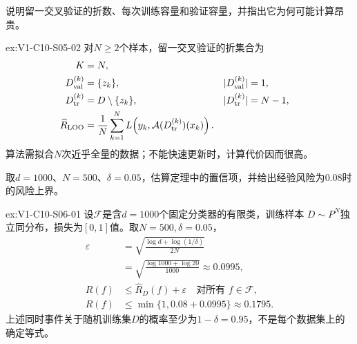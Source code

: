 \begin{SLChapterExercisePairSection}
\begin{exercise}\label{ex:V1-C10-S05-02}
说明留一交叉验证的折数、每次训练容量和验证容量，并指出它为何可能计算昂贵。
\end{exercise}
\label{sol:V1-C10-S05-02}
\begin{chapterexercisesolution}{ex:V1-C10-S05-02}
对$N\ge2$个样本，留一交叉验证的折集合为
\[
\begin{aligned}
K&=N,\\
D_{\rm val}^{(k)}&=\{z_k\},&
|D_{\rm val}^{(k)}|&=1,\\
D_{\rm tr}^{(k)}&=D\setminus\{z_k\},&
|D_{\rm tr}^{(k)}|&=N-1,\\
\widehat R_{\rm LOO}
  &=\frac1N\sum_{k=1}^{N}
    L\!\left(y_k,\mathcal A(D_{\rm tr}^{(k)})(x_k)\right).
\end{aligned}
\]
算法需拟合$N$次近乎全量的数据；不能快速更新时，计算代价因而很高。
\end{chapterexercisesolution}

\begin{exercise}\label{ex:V1-C10-S06-01}
取$d=1000$、$N=500$、$\delta=0.05$，估算定理中的置信项，并给出经验风险为$0.08$时的风险上界。
\end{exercise}
\label{sol:V1-C10-S06-01}
\begin{chapterexercisesolution}{ex:V1-C10-S06-01}
设$\mathcal F$是含$d=1000$个固定分类器的有限类，训练样本
$D\sim P^N$独立同分布，损失为$[0,1]$值。取$N=500,\delta=0.05$，
\[
\begin{aligned}
\varepsilon
  &=\sqrt{\frac{\log d+\log(1/\delta)}{2N}}\\
  &=\sqrt{\frac{\log1000+\log20}{1000}}
    \approx0.0995,\\
R(f)&\le \widehat R_D(f)+\varepsilon
  \quad\text{对所有 }f\in\mathcal F,\\
R(f)&\le\min\{1,0.08+0.0995\}\approx0.1795.
\end{aligned}
\]
上述同时事件关于随机训练集$D$的概率至少为$1-\delta=0.95$，不是每个数据集上的确定等式。
\end{chapterexercisesolution}


\end{SLChapterExercisePairSection}
